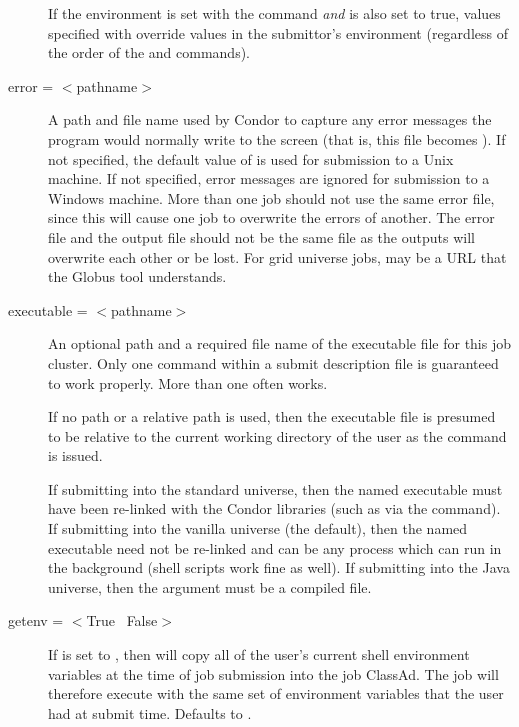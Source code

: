 \begin{description}
If the environment is set with the  command \emph{and}
 is also set to true, values specified with
 override values in the submittor's environment
(regardless of the order of the  and 
commands).



\item[error = $<$pathname$>$]
A path and file name used by Condor to capture any
error messages the program would normally write to the screen
(that is, this file becomes ).
If not specified, the default value of
 is used for submission to a Unix machine.
If not specified, error messages are ignored
for submission to a Windows machine.
More than one job should not use the same error file, since
this will cause one job to overwrite the errors of another.
The error file and the output file should not be the same file
as the outputs will overwrite each other or be lost.
For grid universe jobs,  may be a URL that the Globus
tool  understands.



\item[executable = $<$pathname$>$]
An optional path and a required file name of the executable file for this
job cluster. Only one  command within a
submit description file is guaranteed to work properly.
More than one often works.

If no path or a relative path is used, then the executable file
is presumed to be relative
to the current working directory of the user as the
 command is issued.

If submitting into the standard universe, then the named executable
must have been re-linked with the Condor libraries (such as via the
 command). If submitting into the vanilla universe
(the default), then the named executable need not be re-linked and can
be any process which can run in the background (shell scripts work
fine as well).  If submitting into the Java universe, then the
argument must be a compiled  file.


\item[getenv = $<$True \Bar\ False$>$] If  is set to
, then  will copy all of the user's current
shell environment variables at the time of job submission into the job
ClassAd. The job will therefore execute with the same set of environment
variables that the user had at submit time. Defaults to .


\end{description}
